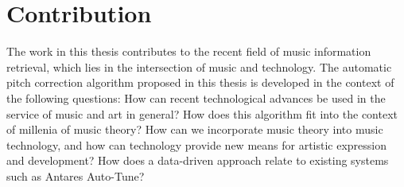 \section{Contribution}

The work in this thesis contributes to the recent field of music information retrieval, which lies in the intersection of music and technology. The automatic pitch correction algorithm proposed in this thesis is developed in the context of the following questions: How can recent technological advances be used in the service of music and art in general? How does this algorithm fit into the context of millenia of music theory? How can we incorporate music theory into music technology, and how can technology provide new means for artistic expression and development? How does a data-driven approach relate to existing systems such as Antares Auto-Tune? 


